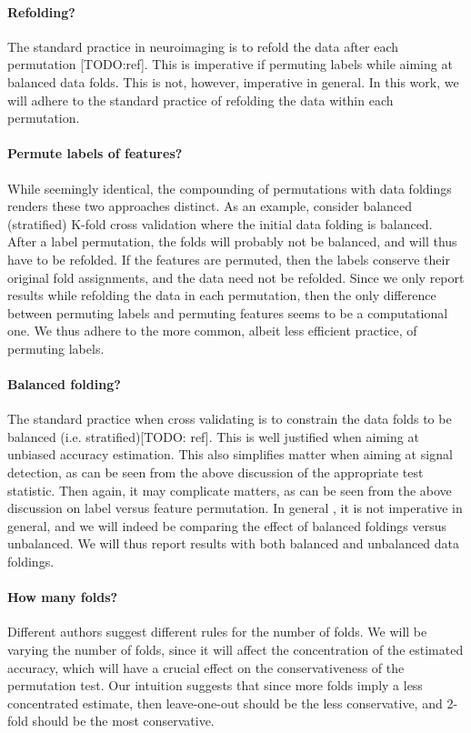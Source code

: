 \documentclass[12pt,a4paper]{article}
\begin{document}
\begin{description}
\paragraph{Refolding?}
The standard practice in neuroimaging is to refold the data after each permutation [TODO:ref].
This is imperative if permuting labels while aiming at balanced data folds. 
This is not, however, imperative in general. 
In this work, we will adhere to the standard practice of refolding the data within each permutation.


\paragraph{Permute labels of features?}
While seemingly identical, the compounding of permutations with data foldings renders these two approaches distinct. 
As an example, consider balanced (stratified) K-fold cross validation where the initial data folding is balanced. 
After a label permutation, the folds will probably not be balanced, and will thus have to be refolded. 
If the features are permuted, then the labels conserve their original fold assignments, and the data need not be refolded. 
Since we only report results while refolding the data in each permutation, then the only difference between permuting labels and permuting features seems to be a computational one. 
We thus adhere to the more common, albeit less efficient practice, of permuting labels. 


\paragraph{Balanced folding?}
The standard practice when cross validating is to constrain the data folds to be balanced (i.e. stratified)[TODO: ref].
This is well justified when aiming at unbiased accuracy estimation. 
This also simplifies matter when aiming at signal detection, as can be seen from the above discussion of the appropriate test statistic. 
Then again, it may complicate matters, as can be seen from the above discussion on label versus feature permutation. 
In general , it is not imperative in general, and we will indeed be comparing the effect of balanced foldings versus unbalanced. 
We will thus report results with both balanced and unbalanced data foldings. 


\paragraph{How many folds?}
Different authors suggest different rules for the number of folds. 
We will be varying the number of folds, since it will affect the concentration of the estimated accuracy, which will have a crucial effect on the conservativeness of the permutation test. 
Our intuition suggests that since more folds imply a less concentrated estimate, then leave-one-out should be the less conservative, and 2-fold should be the most conservative. 

\end{description}
\end{document}
